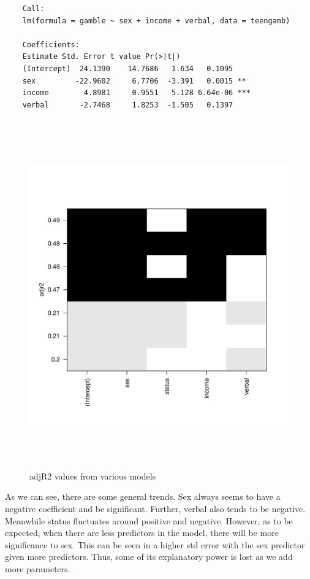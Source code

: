 \documentclass[11pt]{article}
\begin{document}
\begin{enumerate}
\begin{verbatim}
	Call:
	lm(formula = gamble ~ sex + income + verbal, data = teengamb)
	
	Coefficients:
	Estimate Std. Error t value Pr(>|t|)    
	(Intercept)  24.1390    14.7686   1.634   0.1095    
	sex         -22.9602     6.7706  -3.391   0.0015 ** 
	income        4.8981     0.9551   5.128 6.64e-06 ***
	verbal       -2.7468     1.8253  -1.505   0.1397  	
\end{verbatim}

\begin{figure}[H]
	\centering
	\includegraphics[width=15cm,height=15cm]{teenGambDiv}
	\caption[teengambDiv]{adjR2 values from various models}
	\label{teenGamb}
\end{figure}

As we can see, there are some general trends. Sex always seems to have a negative coefficient and be significant. Further, verbal also tends to be negative. Meanwhile status fluctuates around positive and negative. However, as to be expected, when there are less predictors in the model, there will be more significance to sex. This can be seen in a higher std error with the sex predictor given more predictors. Thus, some of its explanatory power is lost as we add more parameters.


\end{enumerate}
\end{document}
